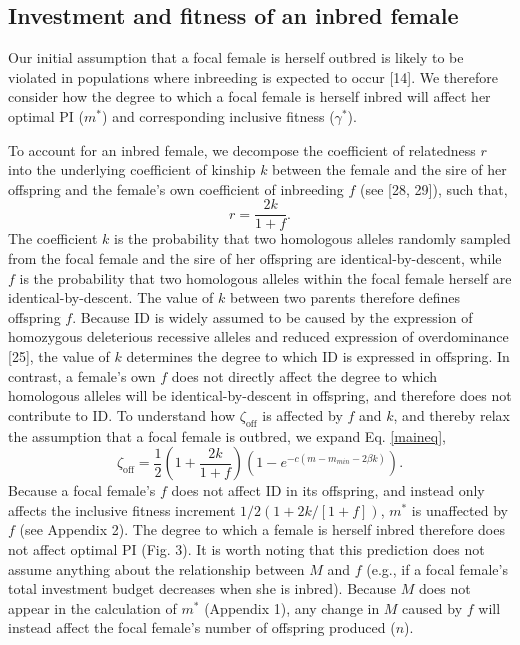 \documentclass[12pt]{article}
\begin{document}
\subsection*{Investment and fitness of an inbred female}

Our initial assumption that a focal female is herself outbred is likely to be violated in populations where inbreeding is expected to occur [14]. We therefore consider how the degree to which a focal female is herself inbred will affect her optimal PI ($m^{*}$) and corresponding inclusive fitness ($\gamma^{*}$).

To account for an inbred female, we decompose the coefficient of relatedness $r$ into the underlying coefficient of kinship $k$ between the female and the sire of her offspring and the female's own coefficient of inbreeding $f$ (see [28, 29]), such that,
\begin{equation} \label{rdef}
r = \frac{2k}{1 + f}.
\end{equation}
The coefficient $k$ is the probability that two homologous alleles randomly sampled from the focal female and the sire of her offspring are identical-by-descent, while $f$ is the probability that two homologous alleles within the focal female herself are identical-by-descent. The value of $k$ between two parents therefore defines offspring $f$. Because ID is widely assumed to be caused by the expression of homozygous deleterious recessive alleles and reduced expression of overdominance [25], the value of $k$ determines the degree to which ID is expressed in offspring. In contrast, a female's own $f$ does not directly affect the degree to which homologous alleles will be identical-by-descent in offspring, and therefore does not contribute to ID. To understand how $\zeta_{\textrm{off}}$ is affected by $f$ and $k$, and thereby relax the assumption that a focal female is outbred, we expand Eq. \ref{maineq},
\begin{equation} \label{maineqr}
\zeta_{\textrm{off}} = \frac{1}{2}\left(1+\frac{2k}{1+f}\right)\left(1-e^{-c\left(m-m_{min}-2\beta k\right)}\right).
\end{equation}
Because a focal female's $f$ does not affect ID in its offspring, and instead only affects the inclusive fitness increment $1/2\left(1+ 2 k / \left[1 + f\right]\right)$, $m^{*}$ is unaffected by $f$  (see Appendix 2). The degree to which a female is herself inbred therefore does not affect optimal PI (Fig. 3). It is worth noting that this prediction does not assume anything about the relationship between $M$ and $f$ (e.g., if a focal female's total investment budget decreases when she is inbred). Because $M$ does not appear in the calculation of $m^{*}$ (Appendix 1), any change in $M$ caused by $f$ will instead affect the focal female's number of offspring produced ($n$).
\end{document}
